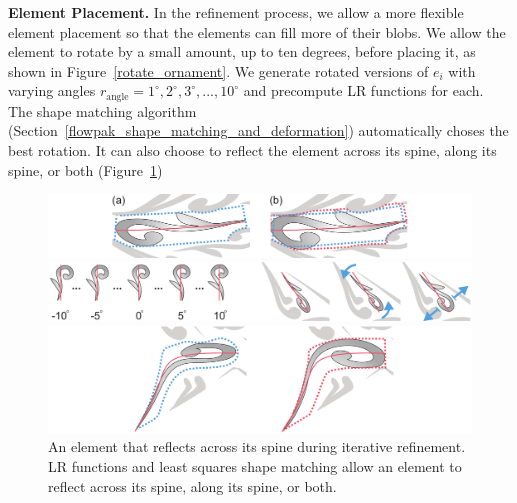 \textbf{Element Placement.}
In the refinement process, we allow a more flexible element placement so that
the elements can fill more of their blobs.  We allow the element
to rotate by a small amount, up to ten degrees, before placing it, as shown in
Figure~\ref{rotate_ornament}. 
We generate rotated versions of $e_{i}$ 
with varying angles $r_\mathrm{angle} = {1^{\circ}, 2^{\circ}, 3^{\circ}, ..., 10^{\circ}}$
and precompute LR functions for each. The shape matching algorithm
(Section~\ref{flowpak_shape_matching_and_deformation}) automatically choses the best rotation. It
can also choose to reflect the element across its spine, along its spine, or both (Figure~\ref{flip_shape})

\begin{figure}
\centering
\includegraphics[width=1.0\textwidth]{figures/flowpak/stretch.pdf}
\caption[Stretching an element]
{\label{stretch_ornament}
(a) An element with its sub-region blob shown in dashed blue line. Note that any blob is constrained by the neighboring elements. 
(b) The dashed red line is the grown blob, which accommodates an enlarged element.}

\bigskip
\includegraphics[width=1.0\textwidth]{figures/flowpak/rotate_ornament.pdf}
\caption[Rotating an element]
{\label{rotate_ornament}
: rotated versions of the original element. 
         The best rotation angle is chosen via least squares matching.
         : original, rotated, and enlarged versions of an element.}
\bigskip

\includegraphics[width=1.0\textwidth]{figures/flowpak/flip.pdf}
\caption[Reflecting an element]
{\label{flip_shape}
An element that reflects across its spine during iterative refinement.
LR functions and least squares shape matching allow an element to reflect
across its spine, along its spine, or both.}
\end{figure}

